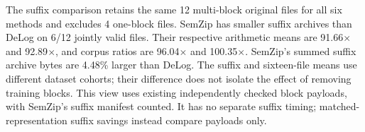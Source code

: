 The suffix comparison retains the same 12 multi-block original files for all six methods and excludes 4 one-block files. SemZip has smaller suffix archives than DeLog on 6/12 jointly valid files. Their respective arithmetic means are 91.66$\times$ and 92.89$\times$, and corpus ratios are 96.04$\times$ and 100.35$\times$. SemZip's summed suffix archive bytes are 4.48\% larger than DeLog. The suffix and sixteen-file means use different dataset cohorts; their difference does not isolate the effect of removing training blocks. This view uses existing independently checked block payloads, with SemZip's suffix manifest counted. It has no separate suffix timing; matched-representation suffix savings instead compare payloads only.
